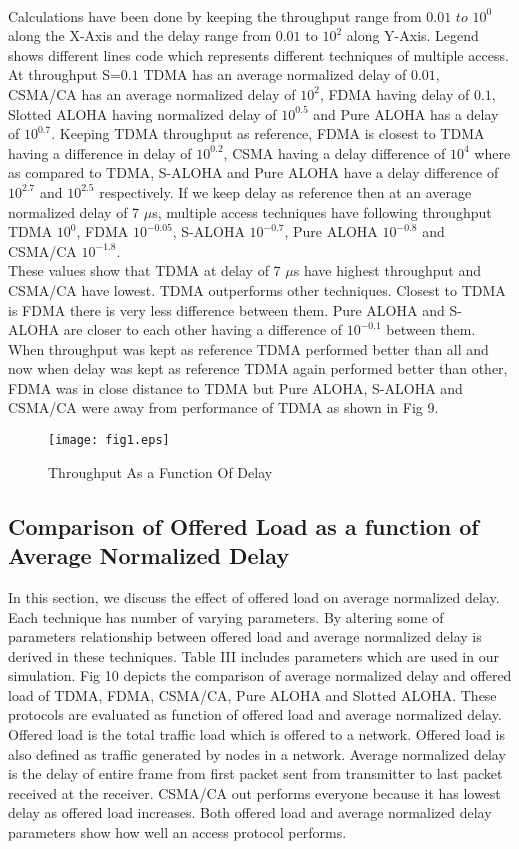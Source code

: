 \documentclass[11pt, conference, compsocconf, onecolumn]{IEEEtran}
\begin{document}
\\
\indent Calculations have been done by keeping the throughput range from $0.01$ $to$ $10^0$ along the X-Axis and the delay range from $0.01$ to $10^2$ along Y-Axis. Legend shows different lines code which represents different techniques of multiple access. At throughput S=$0.1$ TDMA has an average normalized delay of $0.01$, CSMA/CA has an average normalized delay of $10^2$, FDMA having delay of $0.1$, Slotted ALOHA having normalized delay of $10^{0.5}$ and Pure ALOHA has a delay of $10^{0.7}$. Keeping TDMA throughput as reference, FDMA is closest to TDMA having a difference in delay of $10^{0.2}$, CSMA having a delay difference of $10^4$ where as compared to TDMA, S-ALOHA and Pure ALOHA have a delay difference of $10^{2.7}$ and $10^{2.5}$ respectively. If we keep delay as reference then at an average normalized delay of 7 $\mu$s, multiple access techniques have following throughput TDMA $10^0$, FDMA $10^{-0.05}$, S-ALOHA $10^{-0.7}$, Pure ALOHA $10^{-0.8}$ and CSMA/CA $10^{-1.8}$.
\\
\indent These values show that TDMA at delay of 7 $\mu$s have highest throughput and CSMA/CA have lowest. TDMA outperforms other techniques. Closest to TDMA is FDMA there is very less difference between them. Pure ALOHA and S-ALOHA are closer to each other having a difference of $10^{-0.1}$ between them. When throughput was kept as reference TDMA performed better than all and now when delay was kept as reference TDMA again performed better than other, FDMA was in close distance to TDMA but Pure ALOHA, S-ALOHA and CSMA/CA were away from performance of TDMA as shown in Fig 9.

\begin{figure}[!h]
\centering
\caption{Throughput As a Function Of Delay}
\texttt{[image: fig1.eps]}
\end{figure}

\subsection{Comparison of Offered Load as a function of Average Normalized Delay}
In this section, we discuss the effect of offered load on average normalized delay. Each technique has number of varying parameters. By altering some of parameters relationship between offered load and average normalized delay is derived in these techniques. Table III includes parameters which are used in our simulation. Fig 10 depicts the comparison of average normalized delay and offered load of TDMA, FDMA, CSMA/CA, Pure ALOHA and Slotted ALOHA. These protocols are evaluated as function of offered load and average normalized delay.
\\
\indent Offered load is the total traffic load which is offered to a network. Offered load is also defined as traffic generated by nodes in a network. Average normalized delay is the delay of entire frame from first packet sent from transmitter to last packet received at the receiver. CSMA/CA out performs everyone because it has lowest delay as offered load increases. Both offered load and average normalized delay parameters show how well an access protocol performs.
\end{document}
